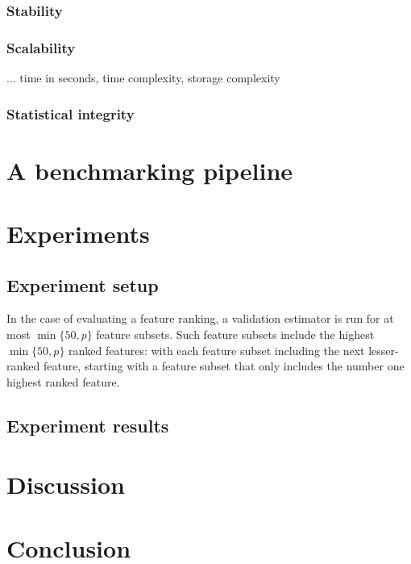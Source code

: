 \documentclass{article}
\begin{document}
\subsubsection{Stability}
\subsubsection{Scalability}
... time in seconds, time complexity, storage complexity

\subsubsection{Statistical integrity}

\section{A benchmarking pipeline}

\section{Experiments}\label{section:experiments}
\subsection{Experiment setup}
In the case of evaluating a feature ranking, a validation estimator is run for at most $\min\{50, p\}$ feature subsets. Such feature subsets include the highest $\min\{50, p\}$ ranked features: with each feature subset including the next lesser-ranked feature, starting with a feature subset that only includes the number one highest ranked feature.

\subsection{Experiment results}

\section{Discussion}\label{section:discussion}
\section{Conclusion}\label{section:conclusion}




\begin{appendices}

\end{appendices}
\clearpage

\glsaddall
\printglossaries
\end{document}
